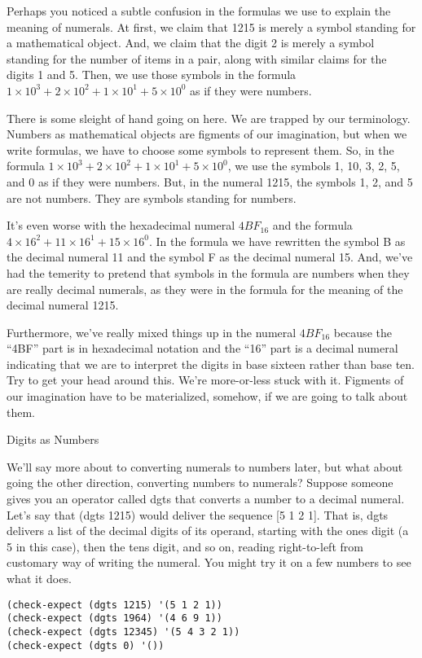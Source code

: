\begin{aside}
Perhaps you noticed a subtle confusion in the formulas we use
to explain the meaning of numerals. At first, we claim that
1215 is merely a symbol standing for a mathematical object.
And, we claim that the digit 2 is merely a symbol standing
for the number of items in a pair, along with similar
claims for the digits 1 and 5. Then, we use those symbols
in the formula $1 \times 10^3 + 2 \times 10^2 + 1 \times 10^1 + 5 \times 10^0$
as if they were numbers.

There is some sleight of hand going on here.
We are trapped by our terminology.
Numbers as mathematical objects are figments of our imagination,
but when we write formulas, we have to choose some symbols to
represent them.
So, in the formula $1 \times 10^3 + 2 \times 10^2 + 1 \times 10^1 + 5 \times 10^0$,
we use the symbols 1, 10, 3, 2, 5, and 0 as if they were numbers.
But, in the numeral 1215, the symbols 1, 2, and 5 are not numbers.
They are symbols standing for numbers.

It's even worse with the hexadecimal numeral $4BF_{16}$
and the formula $4 \times 16^2 + 11 \times 16^1 + 15 \times 16^0$.
In the formula we have rewritten the symbol B as the decimal numeral 11
and the symbol F as the decimal numeral 15.
And, we've had the temerity to pretend that symbols
in the formula are numbers when they are really decimal numerals,
as they were in the formula for the meaning of the decimal numeral 1215.

Furthermore, we've really mixed things up in the numeral
$4BF_{16}$ because the ``4BF'' part is in hexadecimal notation
and the ``16'' part is a decimal numeral indicating that we are
to interpret the digits in base sixteen rather than base ten.
Try to get your head around this.
We're more-or-less stuck with it. Figments of our imagination have
to be materialized, somehow, if we are going to talk about them.
\caption{Digits as Numbers}
\label{aside-digits-as-numbers}
\end{aside}

We'll say more about to converting numerals to numbers later,
but what about going the other direction, converting
numbers to numerals?
Suppose someone gives you an operator called dgts that
converts a number to a decimal numeral.
Let's say that (dgts 1215) would deliver the sequence [5 1 2 1].
That is, dgts delivers a list of the decimal digits
of its operand, 
starting with the ones digit (a 5 in this case),
then the tens digit, and so on, reading right-to-left from
customary way of writing the numeral.
You might try it on a few numbers to see what it does.
\begin{Verbatim}
(check-expect (dgts 1215) '(5 1 2 1))
(check-expect (dgts 1964) '(4 6 9 1))
(check-expect (dgts 12345) '(5 4 3 2 1))
(check-expect (dgts 0) '())
\end{Verbatim}

